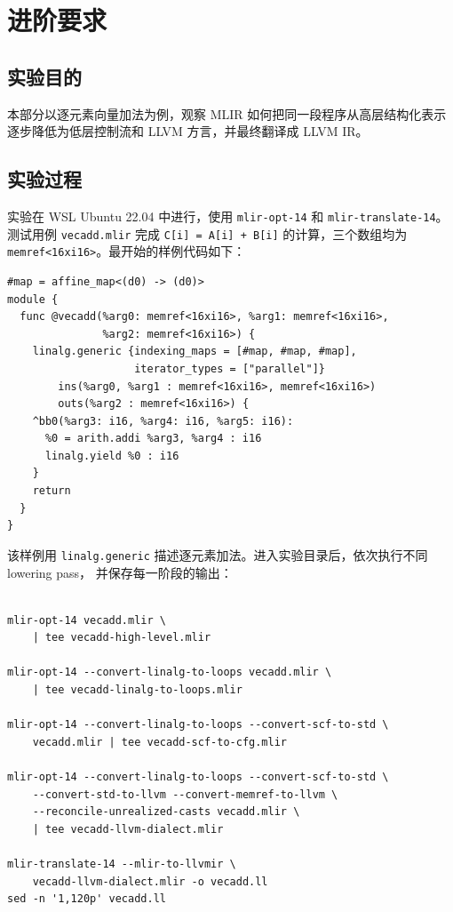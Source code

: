 \documentclass[UTF8,a4paper,10pt]{ctexart}
\begin{document}
\newpage
\section{进阶要求}
\subsection{实验目的}

本部分以逐元素向量加法为例，观察 MLIR 如何把同一段程序从高层结构化表示
逐步降低为低层控制流和 LLVM 方言，并最终翻译成 LLVM IR。

\subsection{实验过程}

实验在 WSL Ubuntu 22.04 中进行，使用 \verb|mlir-opt-14| 和
\verb|mlir-translate-14|。测试用例 \verb|vecadd.mlir| 完成
\verb|C[i] = A[i] + B[i]| 的计算，三个数组均为
\verb|memref<16xi16>|。最开始的样例代码如下：

\begin{verbatim}
#map = affine_map<(d0) -> (d0)>
module {
  func @vecadd(%arg0: memref<16xi16>, %arg1: memref<16xi16>,
               %arg2: memref<16xi16>) {
    linalg.generic {indexing_maps = [#map, #map, #map],
                    iterator_types = ["parallel"]}
        ins(%arg0, %arg1 : memref<16xi16>, memref<16xi16>)
        outs(%arg2 : memref<16xi16>) {
    ^bb0(%arg3: i16, %arg4: i16, %arg5: i16):
      %0 = arith.addi %arg3, %arg4 : i16
      linalg.yield %0 : i16
    }
    return
  }
}
\end{verbatim}

该样例用 \verb|linalg.generic| 描述逐元素加法。进入实验目录后，依次执行不同 lowering pass，
并保存每一阶段的输出：

\begin{verbatim}

mlir-opt-14 vecadd.mlir \
    | tee vecadd-high-level.mlir

mlir-opt-14 --convert-linalg-to-loops vecadd.mlir \
    | tee vecadd-linalg-to-loops.mlir

mlir-opt-14 --convert-linalg-to-loops --convert-scf-to-std \
    vecadd.mlir | tee vecadd-scf-to-cfg.mlir

mlir-opt-14 --convert-linalg-to-loops --convert-scf-to-std \
    --convert-std-to-llvm --convert-memref-to-llvm \
    --reconcile-unrealized-casts vecadd.mlir \
    | tee vecadd-llvm-dialect.mlir

mlir-translate-14 --mlir-to-llvmir \
    vecadd-llvm-dialect.mlir -o vecadd.ll
sed -n '1,120p' vecadd.ll
\end{verbatim}
\end{document}
